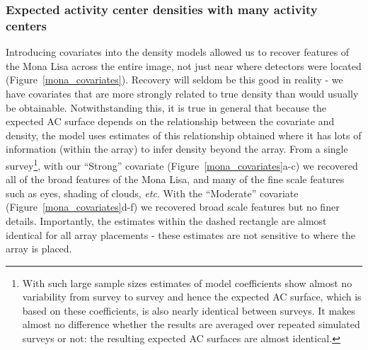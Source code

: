 \documentclass[10pt,a4paper]{article}
\begin{document}

\subsubsection{Expected activity center densities with many activity centers}

Introducing covariates into the density models allowed us to recover features of the Mona Lisa across the entire image, not just near where detectors were located (Figure~\ref{mona_covariates}). Recovery will seldom be this good in reality - we have covariates that are more strongly related to true density than would usually be obtainable. Notwithstanding this, it is true in general that because the expected AC surface depends on the relationship between the covariate and density, the model uses estimates of this relationship obtained where it has lots of information (within the array) to infer density beyond the array. From a single survey\footnote{With such large sample sizes estimates of model coefficients show almost no variability from survey to survey and hence the expected AC surface, which is based on these coefficients, is also nearly identical between surveys. It makes almost no difference whether the results are averaged over repeated simulated surveys or not: the resulting expected AC surfaces are almost identical.}, with our ``Strong'' covariate (Figure~\ref{mona_covariates}a-c) we recovered all of the broad features of the Mona Lisa, and many of the fine scale features such as eyes, shading of clouds, {\it etc}. With the ``Moderate'' covariate (Figure~\ref{mona_covariates}d-f) we recovered broad scale features but no finer details. Importantly, the estimates within the dashed rectangle are almost identical for all array placements - these estimates are not sensitive to where the array is placed.

\end{document}
